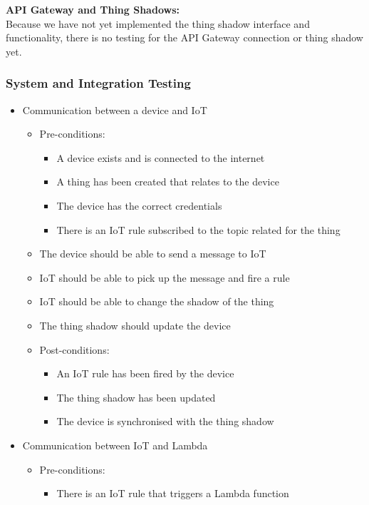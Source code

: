 \documentclass{article}
\begin{document}
			\textbf{API Gateway and Thing Shadows:}
			\\
			Because we have not yet implemented the thing shadow interface and functionality, there is no testing for the API Gateway connection or thing shadow yet.
			
			\subsubsection{System and Integration Testing}
			\begin{itemize}
				\item{Communication between a device and IoT}
					\begin{itemize}
						\item Pre-conditions: 
						\begin{itemize}
							\item A device exists and is connected to the internet
							\item A thing has been created that relates to the device
							\item The device has the correct credentials
							\item There is an IoT rule subscribed to the topic related for the thing
						\end{itemize}
						\item The device should be able to send a message to IoT
						\item IoT should be able to pick up the message and fire a rule
						\item IoT should be able to change the shadow of the thing
						\item The thing shadow should update the device
						\item Post-conditions:
						\begin{itemize}
							\item An IoT rule has been fired by the device
							\item The thing shadow has been updated
							\item The device is synchronised with the thing shadow
						\end{itemize}
					\end{itemize}
				\item{Communication between IoT and Lambda}
				\begin{itemize}
					\item Pre-conditions: 
					\begin{itemize}
						\item There is an IoT rule that triggers a Lambda function

\end{itemize}
\end{itemize}
\end{itemize}
\end{document}
